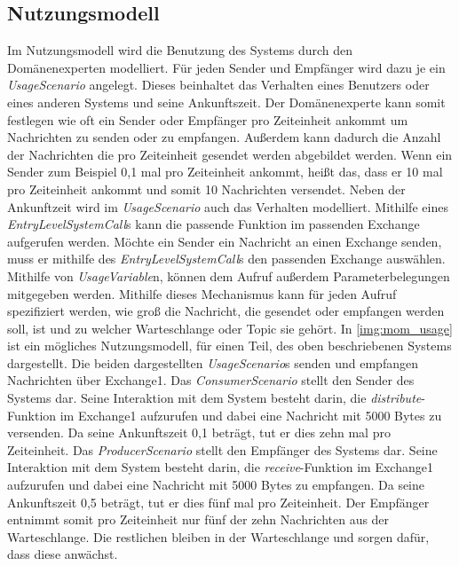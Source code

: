 \subsection{Nutzungsmodell}
Im Nutzungsmodell wird die Benutzung des Systems durch den Domänenexperten modelliert. Für jeden Sender und Empfänger wird dazu je ein \emph{UsageScenario} angelegt. Dieses beinhaltet das Verhalten eines Benutzers oder eines anderen Systems und seine Ankunftszeit. Der Domänenexperte kann somit festlegen wie oft ein Sender oder Empfänger pro Zeiteinheit ankommt um Nachrichten zu senden oder zu empfangen. Außerdem kann dadurch die Anzahl der Nachrichten die pro Zeiteinheit gesendet werden abgebildet werden. Wenn ein Sender zum Beispiel 0,1 mal pro Zeiteinheit ankommt, heißt das, dass er 10 mal pro Zeiteinheit ankommt und somit 10 Nachrichten versendet. Neben der Ankunftzeit wird im \emph{UsageScenario} auch das Verhalten modelliert. Mithilfe eines \emph{EntryLevelSystemCall}s kann die passende Funktion im passenden Exchange aufgerufen werden. Möchte ein Sender ein Nachricht an einen Exchange senden, muss er mithilfe des \emph{EntryLevelSystemCall}s den passenden Exchange auswählen. Mithilfe von \emph{UsageVariable}n, können dem Aufruf außerdem Parameterbelegungen mitgegeben werden. Mithilfe dieses Mechanismus kann für jeden Aufruf spezifiziert werden, wie groß die Nachricht, die gesendet oder empfangen werden soll, ist und zu welcher Warteschlange oder Topic sie gehört. In \autoref{img:mom_usage} ist ein mögliches Nutzungsmodell, für einen Teil, des oben beschriebenen Systems dargestellt. Die beiden dargestellten \emph{UsageScenario}s senden und empfangen Nachrichten über Exchange1. Das \emph{ConsumerScenario} stellt den Sender des Systems dar. Seine Interaktion mit dem System besteht darin, die \emph{distribute}-Funktion im Exchange1 aufzurufen und dabei eine Nachricht mit 5000 Bytes zu versenden. Da seine Ankunftszeit 0,1 beträgt, tut er dies zehn mal pro Zeiteinheit. Das \emph{ProducerScenario} stellt den Empfänger des Systems dar. Seine Interaktion mit dem System besteht darin, die \emph{receive}-Funktion im Exchange1 aufzurufen und dabei eine Nachricht mit 5000 Bytes zu empfangen. Da seine Ankunftszeit 0,5 beträgt, tut er dies fünf mal pro Zeiteinheit. Der Empfänger entnimmt somit pro Zeiteinheit nur fünf der zehn Nachrichten aus der Warteschlange. Die restlichen bleiben in der Warteschlange und sorgen dafür, dass diese anwächst.
